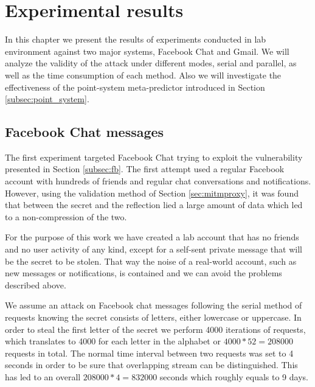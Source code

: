 \chapter{Experimental results}\label{ch:experiment}

In this chapter we present the results of experiments conducted in lab
environment against two major systems, Facebook Chat and Gmail. We will analyze
the validity of the attack under different modes, serial and parallel, as well
as the time consumption of each method. Also we will investigate the
effectiveness of the point-system meta-predictor introduced in Section
\ref{subsec:point_system}.

\section{Facebook Chat messages}\label{sec:fb_experiment}

The first experiment targeted Facebook Chat trying to exploit the vulnerability
presented in Section \ref{subsec:fb}. The first attempt used a regular Facebook
account with hundreds of friends and regular chat conversations and
notifications. However, using the validation method of Section
\ref{sec:mitmproxy}, it was found that between the secret and the reflection
lied a large amount of data which led to a non-compression of the two.

For the purpose of this work we have created a lab account that has no friends
and no user activity of any kind, except for a self-sent private message that
will be the secret to be stolen. That way the noise of a real-world account,
such as new messages or notifications, is contained and we can avoid the
problems described above.

We assume an attack on Facebook chat messages following the serial method of
requests knowing the secret consists of letters, either lowercase or uppercase.
In order to steal the first letter of the secret we perform 4000 iterations of
requests, which translates to 4000 for each letter in the alphabet or
\begin{math}4000*52=208000\end{math} requests in total. The normal time
interval between two requests was set to 4 seconds in order to be sure that
overlapping stream can be distinguished. This has led to an overall
\begin{math}208000*4 = 832000\end{math} seconds which roughly equals to 9 days.

